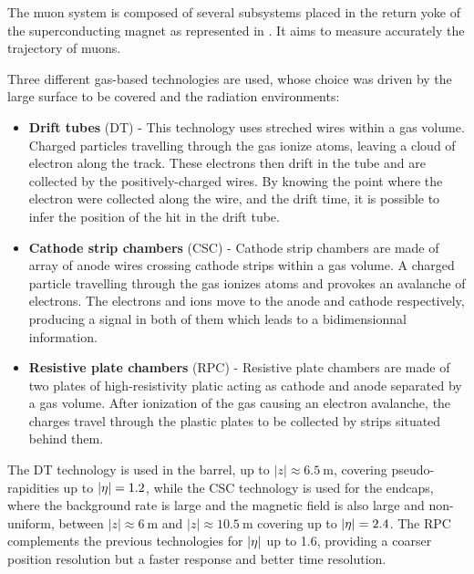         The muon system is composed of several subsystems placed in the return yoke of
        the superconducting magnet as represented in . It aims to
        measure accurately the trajectory of muons.


        Three different gas-based technologies are used, whose choice was driven by the
        large surface to be covered and the radiation environments:
        \begin{itemize}
            \item \textbf{Drift tubes} (DT) - This technology uses streched wires within
                a gas volume. Charged particles travelling through the gas ionize atoms,
                leaving a cloud of electron along the track. These electrons then drift
                in the tube and are collected by the positively-charged wires. By knowing
                the point where the electron were collected along the wire, and the
                drift time, it is possible to infer the position of the hit in the drift tube.
            \item \textbf{Cathode strip chambers} (CSC) - Cathode strip chambers are
                made of array of anode wires crossing cathode strips within a gas volume.
                A charged particle travelling through the gas ionizes atoms and provokes an
                avalanche of electrons. The electrons and ions move to the anode and
                cathode respectively, producing a signal in both of them which leads to
                a bidimensionnal information.
            \item \textbf{Resistive plate chambers} (RPC) - Resistive plate chambers are
                made of two plates of high-resistivity platic acting as cathode and anode
                separated by a gas volume. After ionization of the gas causing an
                electron avalanche, the charges travel through the plastic plates to be
                collected by strips situated behind them.
        \end{itemize}

        The DT technology is used in the barrel, up to $\left|z\right| \approx 6.5~\text{m}$, covering
        pseudo-rapidities up to $\left| \eta \right| = 1.2$, while the CSC technology is used for the endcaps,
        where the background rate is large and the magnetic field is also large and non-uniform,
        between $\left|z\right| \approx 6~\text{m}$ and $\left|z\right| \approx 10.5~\text{m}$
        covering up to $\left| \eta \right| = 2.4$. The RPC complements the previous technologies for
        $\left| \eta \right|$ up to 1.6, providing a coarser position resolution but a faster response
        and better time resolution.

